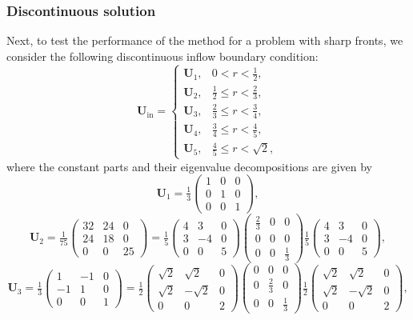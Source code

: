 \documentclass[final,12pt]{amsart}
\theoremstyle{plain}
\theoremstyle{definition}
\begin{document}
\subsubsection{Discontinuous solution}
Next, to test the performance of the method for a problem with sharp fronts, we consider the following discontinuous inflow boundary condition:
\[
\mathbf{U}_{\mathrm{in}} =
\begin{cases}
	\mathbf{U}_1, & 0 < r < \frac{1}{2}, \\
	\mathbf{U}_2, & \frac{1}{2} \leq r < \frac{2}{3}, \\
	\mathbf{U}_3, & \frac{2}{3} \leq r < \frac{3}{4}, \\
	\mathbf{U}_4, & \frac{3}{4} \leq r < \frac{4}{5}, \\
	\mathbf{U}_5, & \frac{4}{5} \leq r < \sqrt{2},
\end{cases}
\]
where the constant parts and their eigenvalue decompositions are given by
\[
\mathbf{U}_1 = \tfrac{1}{3}
\begin{pmatrix}
	1 & 0 & 0 \\
	0 & 1 & 0 \\
	0 & 0 & 1
\end{pmatrix},
\]
\[
\mathbf{U}_2 = \tfrac{1}{75}
\begin{pmatrix}
	32 & 24 & 0 \\
	24 & 18 & 0 \\
	0 & 0 & 25
\end{pmatrix}
= \tfrac{1}{5}
\begin{pmatrix}
	4 & 3 & 0 \\
	3 & -4 & 0 \\
	0 & 0 & 5
\end{pmatrix}
\begin{pmatrix}
	\tfrac{2}{3} & 0 & 0 \\
	0 & 0 & 0 \\
	0 & 0 & \tfrac{1}{3}
\end{pmatrix}
\tfrac{1}{5}
\begin{pmatrix}
	4 & 3 & 0 \\
	3 & -4 & 0 \\
	0 & 0 & 5
\end{pmatrix},
\]
\[
\mathbf{U}_3 = \tfrac{1}{3}
\begin{pmatrix}
	1 & -1 & 0 \\
	-1 & 1 & 0 \\
	0 & 0 & 1
\end{pmatrix}
= \tfrac{1}{2}
\begin{pmatrix}
	\sqrt{2} & \sqrt{2} & 0 \\
	\sqrt{2} & -\sqrt{2} & 0 \\
	0 & 0 & 2
\end{pmatrix}
\begin{pmatrix}
	0 & 0 & 0 \\
	0 & \tfrac{2}{3} & 0 \\
	0 & 0 & \tfrac{1}{3}
\end{pmatrix}
\tfrac{1}{2}
\begin{pmatrix}
	\sqrt{2} & \sqrt{2} & 0 \\
	\sqrt{2} & -\sqrt{2} & 0 \\
	0 & 0 & 2
\end{pmatrix},
\]
\end{document}

